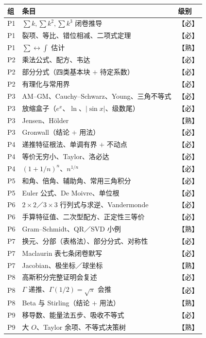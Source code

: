 \begin{center}
\begin{tabular}{L{2.6cm}L{9.8cm}L{2.0cm}}
\toprule
\textbf{组} & \textbf{条目} & \textbf{级别} \\
\midrule
P1 & $\sum k,\sum k^2,\sum k^3$ 闭卷推导 & 【必】 \\
P1 & 裂项、等比、错位相减、二项式定理 & 【必】 \\
P1 & $\sum\leftrightarrow\int$ 估计 & 【熟】 \\
P2 & 乘法公式、配方、韦达 & 【必】 \\
P2 & 部分分式（四类基本块 $+$ 待定系数） & 【必】 \\
P2 & 有理化与常用界 & 【必】 \\
P3 & AM--GM、Cauchy--Schwarz、Young、三角不等式 & 【必】 \\
P3 & 放缩盒子（$e^x$、$\ln$、$|\sin x|$、级数尾） & 【必】 \\
P3 & Jensen、Hölder & 【熟】 \\
P3 & Gronwall（结论 $+$ 用法） & 【必】 \\
P4 & 递推特征根法、单调有界 $+$ 不动点 & 【必】 \\
P4 & 等价无穷小、Taylor、洛必达 & 【必】 \\
P4 & $(1+1/n)^n$、$n^{1/n}$ & 【必】 \\
P5 & 和角、倍角、辅助角、常用三角积分 & 【必】 \\
P5 & Euler 公式、De Moivre、单位根 & 【必】 \\
P6 & $2\times2$／$3\times3$ 行列式与求逆、Vandermonde & 【必】 \\
P6 & 手算特征值、二次型配方、正定性三等价 & 【必】 \\
P6 & Gram--Schmidt、QR／SVD 小例 & 【熟】 \\
P7 & 换元、分部（表格法）、部分分式、对称性 & 【必】 \\
P7 & Maclaurin 表七条闭卷默写 & 【必】 \\
P7 & Jacobian、极坐标／球坐标 & 【熟】 \\
P8 & 高斯积分完整证明会复述 & 【必】 \\
P8 & $\Gamma$ 递推、$\Gamma(1/2)=\sqrt\pi$ 会推 & 【必】 \\
P8 & Beta 与 Stirling（结论 $+$ 用法） & 【熟】 \\
P9 & 移导数、能量法五步、吸收不等式 & 【必】 \\
P9 & 大 $O$、Taylor 余项、不等式决策树 & 【熟】 \\
\bottomrule
\end{tabular}
\end{center}
